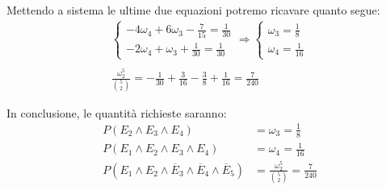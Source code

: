 Mettendo a sistema le ultime due equazioni potremo ricavare quanto segue:
\begin{align*}
\begin{cases} 
-4\omega_4+6\omega_3-\frac{7}{15}= \frac{1}{30} \\
-2\omega_4+\omega_3+\frac{1}{30} = \frac{1}{30} 
\end{cases}
\Longrightarrow
\begin{cases} 
\omega_3 = \frac{1}{8}\\
\omega_4 = \frac{1}{16}
\end{cases}\\ \\
\frac{\omega_2^5}{\binom{5}{2}} = -\frac{1}{30}+\frac{3}{16}-\frac{3}{8}+\frac{1}{16} = \frac{7}{240}
\end{align*}

In conclusione, le quantità richieste saranno:
\begin{align*}
	 P(E_2\wedge E_3\wedge E_4) &= \omega_3 = \frac{1}{8}\\
	 P(E_1\wedge E_2\wedge E_3\wedge E_4)&= \omega_4 = \frac{1}{16}\\
	 P(E_1\wedge E_2\wedge\overline{E}_3\wedge\overline{E}_4\wedge\overline{E}_5) &= \frac{\omega_2^5}{\binom{5}{2}} = \frac{7}{240}
\end{align*}

